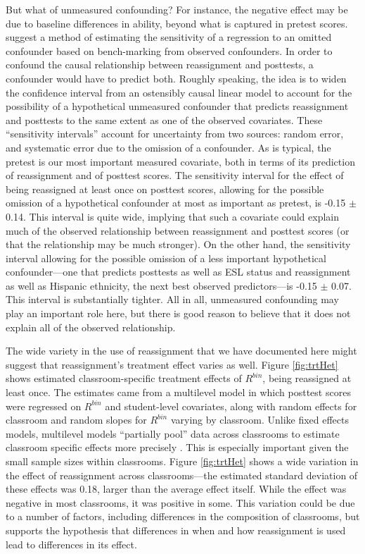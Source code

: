 \documentclass[12pt]{article}\usepackage[]{graphicx}\usepackage[]{color}
\begin{document}
But what of unmeasured confounding?
For instance, the negative effect may be due to baseline differences
in ability, beyond what is captured in pretest scores.
\citet{hhh} suggest a method of estimating the sensitivity of a regression to an omitted confounder based on bench-marking from observed confounders.
In order to confound the causal relationship between reassignment and posttests, a confounder would have to predict both.
Roughly speaking, the idea is to widen the confidence interval from an
ostensibly causal linear model to account for the possibility of a hypothetical unmeasured confounder that predicts reassignment and posttests to the same extent as one of the observed covariates.
These ``sensitivity intervals'' account for uncertainty from two sources: random error, and systematic error due to the omission of a confounder.
As is typical, the pretest is our most important measured covariate, both in terms of its prediction of reassignment and of posttest scores.
The sensitivity interval for the effect of being reassigned at least
once on posttest scores, allowing for the possible omission of a
hypothetical confounder at most as important as pretest, is
-0.15 $\pm$
0.14.
This interval is quite wide, implying that such a covariate could
explain much of the observed relationship between reassignment and
posttest scores (or that the relationship may be much stronger).
On the other hand, the sensitivity interval allowing for the possible
omission of a less important hypothetical confounder---one that
predicts posttests as well as ESL status and reassignment as well as
Hispanic ethnicity, the next best observed
predictors---is
-0.15 $\pm$
0.07.
This interval is substantially tighter.
All in all, unmeasured confounding may play an important role here,
but there is good reason to believe that it does not explain all of
the observed relationship.

The wide variety in the use of reassignment that we have documented
here might suggest that reassignment's treatment effect varies as
well.
Figure \ref{fig:trtHet} shows estimated classroom-specific treatment
effects of $R^{bin}$, being reassigned at least once.
The estimates came from a multilevel model in which posttest scores
were regressed on $R^{bin}$ and student-level covariates, along with
random effects for classroom and random slopes for $R^{bin}$ varying
by classroom.
Unlike fixed effects models, multilevel models ``partially pool'' data
across classrooms to estimate classroom specific effects more precisely \citep{gelmanHill}.
This is especially important given the small sample sizes within
classrooms.
Figure \ref{fig:trtHet} shows a wide variation in the effect of
reassignment across classrooms---the estimated standard deviation of
these effects was
0.18,
larger than the average effect itself.
While the effect was negative in most classrooms, it was positive in some.
This variation could be due to a number of factors, including
differences in the composition of classrooms, but supports the
hypothesis that differences in when and how reassignment is used
lead to differences in its effect.
\end{document}
